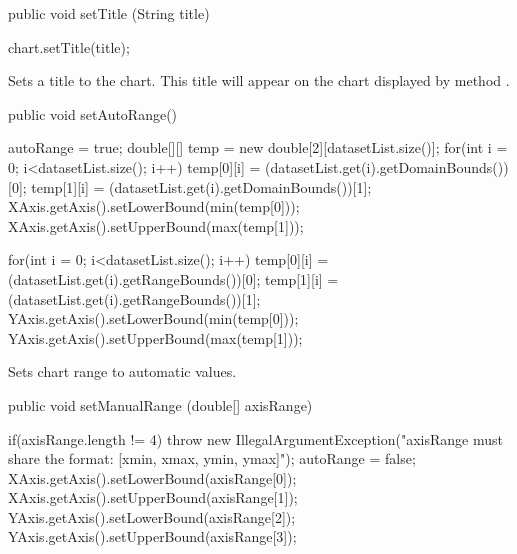 \begin{htmlonly}
\end{htmlonly}
\begin{code}

   public void setTitle (String title) \begin{hide} {
      chart.setTitle(title);
   }\end{hide}
\end{code}
\begin{tabb}
   Sets a title to the chart. This title will appear on the chart displayed by method .
\end{tabb}
\begin{htmlonly}
\end{htmlonly}
\begin{code}

   public void setAutoRange() \begin{hide} {
      autoRange = true;
      double[][] temp = new double[2][datasetList.size()];
      for(int i = 0; i<datasetList.size(); i++) {
         temp[0][i] = (datasetList.get(i).getDomainBounds())[0];
         temp[1][i] = (datasetList.get(i).getDomainBounds())[1];
      }
      XAxis.getAxis().setLowerBound(min(temp[0]));
      XAxis.getAxis().setUpperBound(max(temp[1]));

      for(int i = 0; i<datasetList.size(); i++) {
         temp[0][i] = (datasetList.get(i).getRangeBounds())[0];
         temp[1][i] = (datasetList.get(i).getRangeBounds())[1];
      }
      YAxis.getAxis().setLowerBound(min(temp[0]));
      YAxis.getAxis().setUpperBound(max(temp[1]));
   }\end{hide}
\end{code}
\begin{tabb}
   Sets chart range to automatic values.
\end{tabb}
\begin{code}

   public void setManualRange (double[] axisRange) \begin{hide} {
      if(axisRange.length != 4)
         throw new IllegalArgumentException("axisRange must share the format: [xmin, xmax, ymin, ymax]");
      autoRange = false;
      XAxis.getAxis().setLowerBound(axisRange[0]);
      XAxis.getAxis().setUpperBound(axisRange[1]);
      YAxis.getAxis().setLowerBound(axisRange[2]);
      YAxis.getAxis().setUpperBound(axisRange[3]);
   }\end{hide}
\end{code}

